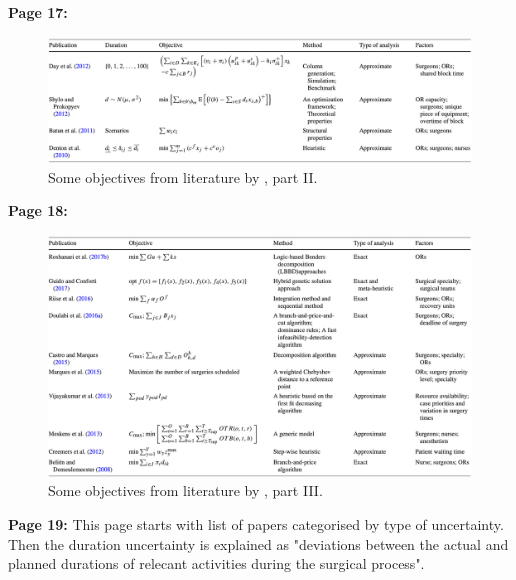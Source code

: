     \textbf{Page 17:}
    \begin{figure}[H]
        \centering
        \includegraphics[width=1\textwidth]{figures/0013_SR01CN19/fig4.png}
        \caption{Some objectives from literature by \cite{x203}, part II.}
        \label{fig4:0013_SR01CN19}
    \end{figure}
    
    \textbf{Page 18:}
    \begin{figure}[H]
        \centering
        \includegraphics[width=1\textwidth]{figures/0013_SR01CN19/fig5.png}
        \caption{Some objectives from literature by \cite{x203}, part III.}
        \label{fig5:0013_SR01CN19}
    \end{figure}

    \textbf{Page 19:}
    This page starts with list of papers categorised by type of uncertainty. Then the duration uncertainty is explained as "deviations between the actual and planned durations of relecant activities during the surgical process".


